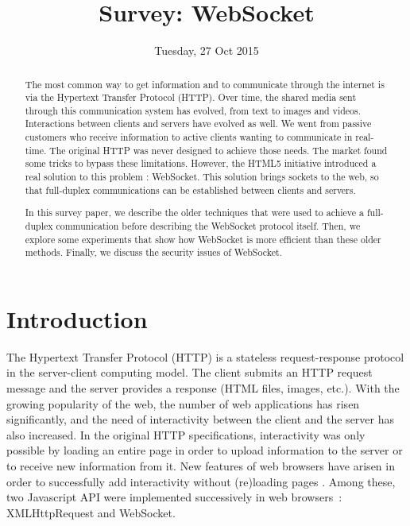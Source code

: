 \documentclass[10pt,journal,compsoc]{IEEEtran}
\newcommand{\ws}{WebSocket}
\begin{document}
\author{}

\title{Survey: \ws }

\date{Tuesday, 27 Oct 2015}


\maketitle
\IEEEpeerreviewmaketitle



\begin{abstract}
The most common way to get information and to communicate through the internet is via the Hypertext Transfer Protocol (HTTP).
Over time, the shared media sent through this communication system has evolved, from text to images and videos.
Interactions between clients and servers have evolved as well.
We went from passive customers who receive information to active clients wanting to communicate in real-time.
The original HTTP was never designed to achieve those needs.
The market found some tricks to bypass these limitations.
However, the HTML5 initiative introduced a real solution to this problem : \ws{}.
This solution brings sockets to the web, so that full-duplex communications can be established between clients and servers.

In this survey paper, we describe the older techniques that were used to achieve a full-duplex communication before describing the \ws{} protocol itself.
Then, we explore some experiments that show how \ws{} is more efficient than these older methods.
Finally, we discuss the security issues of \ws{}.
\end{abstract}


\section{Introduction}

The Hypertext Transfer Protocol (HTTP) is a stateless request-response protocol in the server-client computing model.
The client submits an HTTP request message and the server provides a response (HTML files, images, etc.).
With the growing popularity of the web, the number of web applications has risen significantly, and the need of interactivity between the client and the server has also increased. %
In the original HTTP specifications, interactivity was only possible by loading an entire page in order to upload information to the server or to receive new information from it. %
New features of web browsers have arisen in order to successfully add interactivity without (re)loading pages \cite{RealTimeMonitoringUsingAJAXAndWebSockets}.
Among these, two Javascript API were implemented successively in web \mbox{browsers :} XMLHttpRequest and \ws. %
\end{document}
